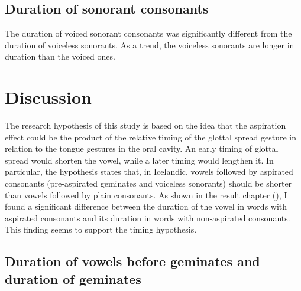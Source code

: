 \documentclass[11pt,a4paper,openany]{memoir}\usepackage[]{graphicx}\usepackage[]{color}
\begin{document}
\section{Duration of sonorant consonants}
\label{s:sonorantdur}




The duration of voiced sonorant consonants was significantly different from the duration of voiceless sonorants.
As a trend, the voiceless sonorants are longer in duration than the voiced ones.









\chapter{Discussion}
\label{c:discussion}

The research hypothesis of this study is based on the idea that the aspiration effect could be the product of the relative timing of the glottal spread gesture in relation to the tongue gestures in the oral cavity.
An early timing of glottal spread would shorten the vowel, while a later timing would lengthen it.
In particular, the hypothesis states that, in Icelandic, vowels followed by aspirated consonants (pre-aspirated geminates and voiceless sonorants) should be shorter than vowels followed by plain consonants.
As shown in the result chapter (), I found a significant difference between the duration of the vowel in words with aspirated consonants and its duration in words with non-aspirated consonants.
This finding seems to support the timing hypothesis.

\section{Duration of vowels before geminates and duration of geminates}
\end{document}
